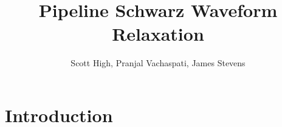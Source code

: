\documentclass{svmult-ddm}
\begin{document}
\title*{Pipeline Schwarz Waveform Relaxation}

\author{Scott High, Pranjal Vachaspati, James Stevens}

\maketitle



\section{Introduction}
\label{prop_sec:introduction}
\end{document}
